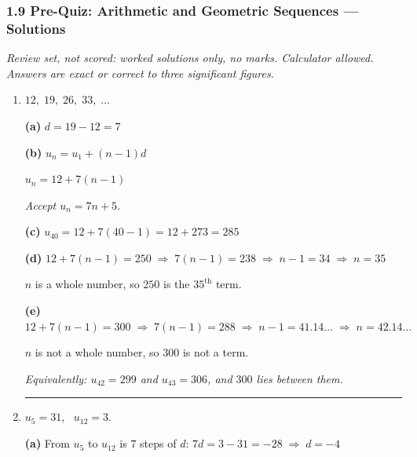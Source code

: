 \documentclass[12pt, twoside]{article}
\begin{document}
\subsubsection*{1.9 Pre-Quiz: Arithmetic and Geometric Sequences --- Solutions}

\emph{Review set, not scored: worked solutions only, no marks. Calculator
allowed. Answers are exact or correct to three significant figures.}

\begin{enumerate}[itemsep=0.3cm]

\item[1.]

$12,\; 19,\; 26,\; 33,\; \ldots$

\medskip

\textbf{(a)} $d = 19 - 12 = 7$

\medskip

\textbf{(b)} $u_{n} = u_{1} + (n - 1)d$

$u_{n} = 12 + 7(n - 1)$

\emph{Accept $u_{n} = 7n + 5$.}

\medskip

\textbf{(c)} $u_{40} = 12 + 7(40 - 1) = 12 + 273 = 285$

\medskip

\textbf{(d)} $12 + 7(n - 1) = 250 \;\Rightarrow\; 7(n - 1) = 238
\;\Rightarrow\; n - 1 = 34 \;\Rightarrow\; n = 35$

$n$ is a whole number, so $250$ is the $35^{\text{th}}$ term.

\medskip

\textbf{(e)} $12 + 7(n - 1) = 300 \;\Rightarrow\; 7(n - 1) = 288
\;\Rightarrow\; n - 1 = 41.14\ldots \;\Rightarrow\; n = 42.14\ldots$

$n$ is not a whole number, so $300$ is not a term.

\emph{Equivalently: $u_{42} = 299$ and $u_{43} = 306$, and $300$ lies
between them.}

\bigskip \hrule \bigskip

\item[2.]

$u_{5} = 31$, \ $u_{12} = 3$.

\medskip

\textbf{(a)} From $u_{5}$ to $u_{12}$ is $7$ steps of $d$:
$7d = 3 - 31 = -28 \;\Rightarrow\; d = -4$


\end{enumerate}
\end{document}
